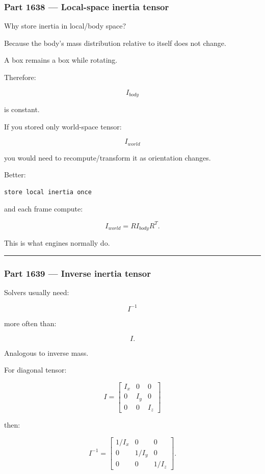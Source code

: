 \subsubsection{Part 1638 --- Local-space inertia tensor}\label{part-1638-local-space-inertia-tensor}

Why store inertia in local/body space?

Because the body's mass distribution relative to itself does not change.

A box remains a box while rotating.

Therefore:

\[
I_{body}
\]

is constant.

If you stored only world-space tensor:

\[
I_{world}
\]

you would need to recompute/transform it as orientation changes.

Better:

\begin{verbatim}
store local inertia once
\end{verbatim}

and each frame compute:

\[
I_{world}
=
RI_{body}R^T.
\]

This is what engines normally do.

\begin{center}\rule{0.5\linewidth}{0.5pt}\end{center}

\subsubsection{Part 1639 --- Inverse inertia tensor}\label{part-1639-inverse-inertia-tensor}

Solvers usually need:

\[
I^{-1}
\]

more often than:

\[
I.
\]

Analogous to inverse mass.

For diagonal tensor:

\[
I=
\begin{bmatrix}
I_x&0&0\\
0&I_y&0\\
0&0&I_z
\end{bmatrix}
\]

then:

\[
\boxed{
I^{-1}
=
\begin{bmatrix}
1/I_x&0&0\\
0&1/I_y&0\\
0&0&1/I_z
\end{bmatrix}.
}
\]

